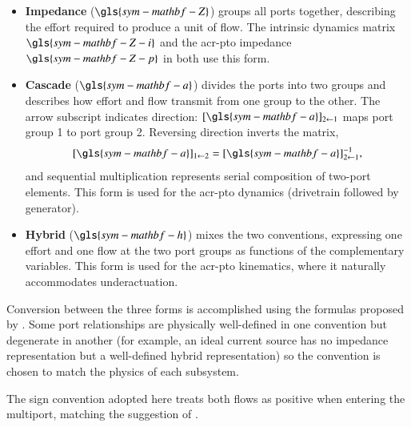 \begin{itemize}
    \item \textbf{Impedance} ($\gls{sym-mathbf-Z}$)
        groups all ports together, describing the effort required to produce a unit of flow.
        The intrinsic dynamics matrix $\gls{sym-mathbf-Z-i}$ and the \gls{acr-pto} impedance
        $\gls{sym-mathbf-Z-p}$ in  both use this form.
    \item \textbf{Cascade} ($\gls{sym-mathbf-a}$)
        divides the ports into two groups and describes how effort and flow transmit from one group to the other.
        The arrow subscript indicates direction:
        $[\gls{sym-mathbf-a}]_{2\leftarrow 1}$ maps port group 1 to port group 2.
        Reversing direction inverts the matrix,
        \begin{equation}\label{eq:cascade-inverse}
            [\gls{sym-mathbf-a}]_{1\leftarrow 2} = [\gls{sym-mathbf-a}]_{2\leftarrow 1}^{-1},
        \end{equation}
        and sequential multiplication represents serial composition of two-port elements.
        This form is used for the \gls{acr-pto} dynamics (drivetrain followed by generator).
    \item \textbf{Hybrid} ($\gls{sym-mathbf-h}$)
        mixes the two conventions, expressing one effort and one flow at the two port groups as functions of the complementary variables.
        This form is used for the \gls{acr-pto} kinematics, where it naturally accommodates underactuation.
\end{itemize}

Conversion between the three forms is accomplished using the formulas proposed by \citet{reveyrand_multiport_2018}.
Some port relationships are physically well-defined in one convention but degenerate in another (for example, an ideal current source has no impedance representation but a well-defined hybrid representation) so the convention is chosen to match the physics of each subsystem.

The sign convention adopted here treats both flows as positive when entering the multiport,
matching the suggestion of \citet{coe_co-design_2025}.


